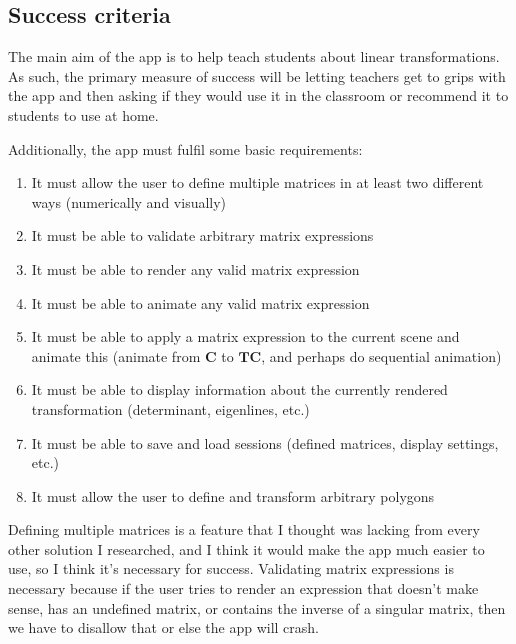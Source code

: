 \documentclass[../main.tex]{subfiles}
\begin{document}
\subsection{Success criteria\label{analysis:success-criteria}}

The main aim of the app is to help teach students about linear transformations. As such, the primary measure of success will be letting teachers get to grips with the app and then asking if they would use it in the classroom or recommend it to students to use at home.

Additionally, the app must fulfil some basic requirements:
\vspace{-0.3cm}
\begin{enumerate}
	\item\label{success-criterion:define-multiple-matrices} It must allow the user to define multiple matrices in at least two different ways (numerically and visually)
	\item\label{success-criterion:validate-arbitrary-matrix-expressions} It must be able to validate arbitrary matrix expressions
	\item\label{success-criterion:render-any-valid-expression} It must be able to render any valid matrix expression
	\item\label{success-criterion:animate-any-valid-expression} It must be able to animate any valid matrix expression
	\item\label{success-criterion:applicative-animation} It must be able to apply a matrix expression to the current scene and animate this (animate from $\mathbf{C}$ to $\mathbf{TC}$, and perhaps do sequential animation)
	\item\label{success-criterion:display-matrix-info} It must be able to display information about the currently rendered transformation (determinant, eigenlines, etc.)
	\item\label{success-criterion:save-and-load-sessions} It must be able to save and load sessions (defined matrices, display settings, etc.)
	\item\label{success-criterion:transform-polygons} It must allow the user to define and transform arbitrary polygons
\end{enumerate}

Defining multiple matrices is a feature that I thought was lacking from every other solution I researched, and I think it would make the app much easier to use, so I think it's necessary for success. Validating matrix expressions is necessary because if the user tries to render an expression that doesn't make sense, has an undefined matrix, or contains the inverse of a singular matrix, then we have to disallow that or else the app will crash.
\end{document}
